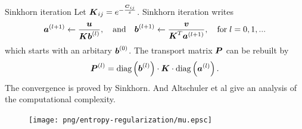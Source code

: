\begin{frame}{Sinkhorn iteration}
    \footnotesize
    Let $\boldsymbol K_{ij} = e^{-\frac{\boldsymbol C_{ij}}{\varepsilon}}$.
    Sinkhorn iteration writes
    \begin{equation}
        \boldsymbol a^{(l+1)} \gets \frac{\boldsymbol u}{\boldsymbol K \boldsymbol b^{(l)}},
        \quad \text{and}\quad
        \boldsymbol b^{(l+1)} \gets \frac{\boldsymbol v}{\boldsymbol K^T \boldsymbol a^{(l+1)}},
        \quad \text{for}\; l=0,1,...
    \end{equation}
    which starts with an arbitary $\boldsymbol b^{(0)}$.
    The transport matrix $\boldsymbol P$ can be rebuilt by
    \begin{equation}
        \boldsymbol P^{(l)} = \text{diag}\left(\boldsymbol b^{(l)}\right)
        \cdot \boldsymbol K \cdot \text{diag}\left(\boldsymbol a^{(l)}\right).
    \end{equation}
    The convergence is proved by Sinkhorn.
    And Altschuler et al give an analysis of the computational complexity.

    \vspace{-1em}
    \begin{figure}
        \captionsetup{font=scriptsize}
        \begin{minipage}[t]{0.05\linewidth}
            \vspace{0pt}
            \hfill
        \end{minipage}
        \hfill
        \begin{minipage}[t]{0.18\linewidth}
            \vspace{0pt}
            \centering
            \texttt{[image: png/entropy-regularization/mu.epsc]}
        \end{minipage}
        \hfill
        \begin{minipage}[t]{0.18\linewidth}
            \vspace{0pt}
            \hfill
        \end{minipage}
        \hfill
        \begin{minipage}[t]{0.18\linewidth}
            \vspace{0pt}
            \hfill
        \end{minipage}
        \hfill
        \begin{minipage}[t]{0.18\linewidth}
            \vspace{0pt}
            \hfill
        \end{minipage}
        \hfill
        \begin{minipage}[t]{0.18\linewidth}
            \vspace{0pt}
            \hfill
        \end{minipage}
        \hfill
    \end{figure}
    

\end{frame}
